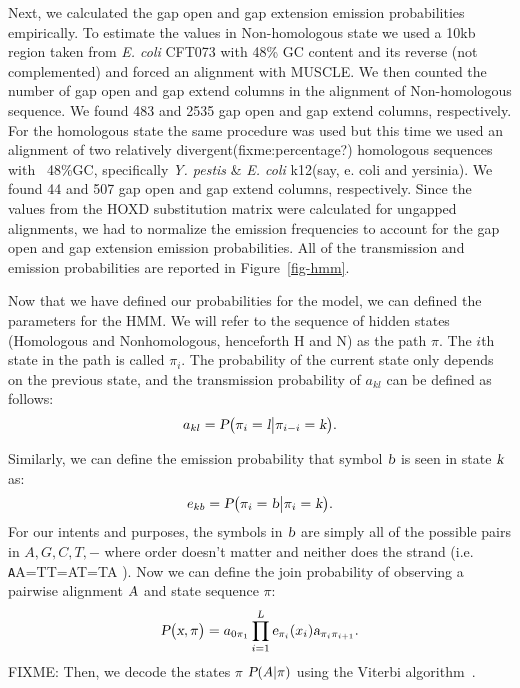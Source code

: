 \documentclass{ws-procs9x6}
\begin{document}
Next, we calculated the gap open and gap extension emission probabilities empirically. To estimate the values in Non-homologous state we used a 10kb region taken from \emph{E. coli} CFT073 with 48\% GC content and its reverse (not complemented) and forced an alignment with MUSCLE.  We then counted the number of gap open and gap extend columns in the alignment of Non-homologous sequence. We found 483 and 2535 gap open and  gap extend columns, respectively.  For the homologous state the same procedure was used but this time we used an alignment of two relatively divergent(fixme:percentage?) homologous sequences with ~48\%GC, specifically \emph{Y. pestis} \& \emph{E. coli} k12(say, e. coli and yersinia). We found 44 and 507 gap open and  gap extend columns, respectively.  Since the values from the HOXD substitution matrix were calculated for ungapped alignments, we had to normalize the emission frequencies to account for the gap open and gap extension emission probabilities. All of the transmission and emission probabilities are reported in Figure~\ref{fig-hmm}.

Now that we have defined our probabilities for the model, we can defined the parameters for the HMM. We will refer to the sequence of hidden states (Homologous and Nonhomologous, henceforth H and N) as the path $\pi$. The $i$th state in the path is called $\pi_{i}$. The probability of the current state only depends on the previous state, and the transmission probability of $a_{kl}$ can be defined as follows:
\begin{equation}
a_{kl} = \textsl{P}\big(\pi_{i}=\textsl{l}\big|\pi_{i-i}=\textsl{k}\big).
\end{equation}

Similarly, we can define the emission probability that symbol $\textsl{b}$ is seen in state $\textsl{k}$ as:
\begin{equation}
e_{kb} = \textsl{P}\big(\pi_{i}=\textsl{b}\big|\pi_{i}=\textsl{k}\big).
\end{equation}
For our intents and purposes, the symbols in $\textsl{b}$ are simply all of the possible pairs in ${A,G,C,T,-}$ where order doesn't matter and neither does the strand (i.e. {\texttt AA=TT=AT=TA} ). Now we can define the join probability of observing a pairwise alignment $\textsl{A}$ and state sequence $\pi$:
\begin{equation}
\textsl{P}\big(\textsl{x},\pi\big) = a_{0\pi_{1}}\prod_{i=1}^\textsl{L}\textsl{e}_{\pi_{i}}(x_{i})\textsl{a}_{\pi_{i}\pi_{i+1}}.
\end{equation}
FIXME: Then, we decode the states $\pi$ $\textsl{P}(A |\pi)$ using the Viterbi algorithm~\cite{durbin}.
\end{document}
